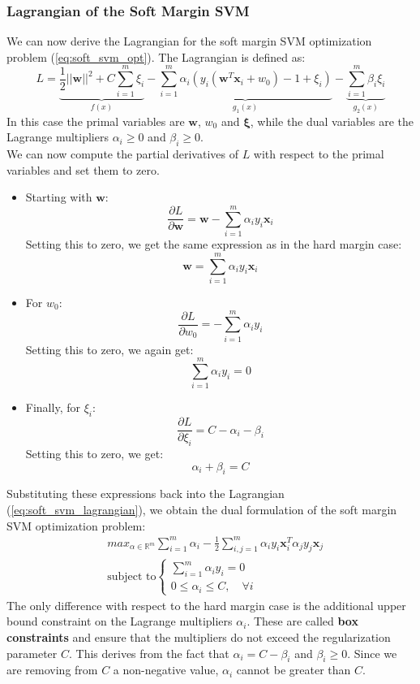 \subsubsection{Lagrangian of the Soft Margin SVM}
We can now derive the Lagrangian for the soft margin SVM optimization problem (\ref{eq:soft_svm_opt}).
The Lagrangian is defined as:
\begin{equation}\label{eq:soft_svm_lagrangian}
    L = \underbrace{\frac{1}{2} ||\boldsymbol{w}||^2 + C \sum_{i=1}^{m} \xi_i}_{f(x)} - \underbrace{\sum_{i=1}^{m} \alpha_i (y_i (\boldsymbol{w}^T \boldsymbol{x}_i + w_0) - 1 + \xi_i)}_{g_1(x)} - \underbrace{\sum_{i=1}^{m} \beta_i \xi_i}_{g_2(x)}
\end{equation}
In this case the primal variables are $\boldsymbol{w}$, $w_0$ and $\boldsymbol{\xi}$, while the dual variables are the Lagrange multipliers $\alpha_i \geq 0$ and $\beta_i \geq 0$.
\\We can now compute the partial derivatives of $L$ with respect to the primal variables and set them to zero.
\begin{itemize}
    \item Starting with $\boldsymbol{w}$:
    \[ \frac{\partial L}{\partial \boldsymbol{w}} = \boldsymbol{w} - \sum_{i=1}^{m} \alpha_i y_i \boldsymbol{x}_i \]
    Setting this to zero, we get the same expression as in the hard margin case:
    \[ \boldsymbol{w} = \sum_{i=1}^{m} \alpha_i y_i \boldsymbol{x}_i \]
    \item For $w_0$:
    \[ \frac{\partial L}{\partial w_0} = - \sum_{i=1}^{m} \alpha_i y_i \]
    Setting this to zero, we again get:
    \[ \sum_{i=1}^{m} \alpha_i y_i = 0 \]
    \item Finally, for $\xi_i$:
    \[ \frac{\partial L}{\partial \xi_i} = C - \alpha_i - \beta_i \]
    Setting this to zero, we get:
    \[ \alpha_i + \beta_i = C \]
\end{itemize}
Substituting these expressions back into the Lagrangian (\ref{eq:soft_svm_lagrangian}), we obtain the dual formulation of the soft margin SVM optimization problem:
\begin{equation}
    \label{eq:soft_svm_dual}
    \begin{aligned}
        & max_{\alpha \in \mathbb{R}^m } \sum_{i=1}^{m} \alpha_i 
        - \frac{1}{2} \sum_{i,j=1}^{m} \alpha_i y_i \mathbf{x}_i^{T} \alpha_j y_j \mathbf{x}_j \\
        & \text{subject to} \begin{cases}
            \sum_{i=1}^{m} \alpha_i y_i = 0 \\
            0 \leq \alpha_i \leq C, \quad \forall i
        \end{cases}
    \end{aligned}
\end{equation}
The only difference with respect to the hard margin case is the additional upper bound constraint on the Lagrange multipliers $\alpha_i$.
These are called \textbf{box constraints} and ensure that the multipliers do not exceed the regularization parameter $C$.
This derives from the fact that $\alpha_i = C - \beta_i$ and $\beta_i \geq 0$. 
Since we are removing from $C$ a non-negative value, $\alpha_i$ cannot be greater than $C$.

